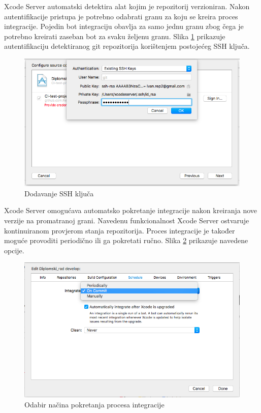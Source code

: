 \documentclass[times, utf8, diplomski, numeric]{fer}
\begin{document}
Xcode Server automatski detektira alat kojim je repozitorij verzioniran. Nakon autentifikacije pristupa je potrebno odabrati granu za koju se kreira proces integracije. Pojedin bot integraciju obavlja za samo jednu granu zbog čega je potrebno kreirati zaseban bot za svaku željenu granu. Slika \ref{fig:BotAddingSSH} prikazuje autentifikaciju detektiranog git repozitorija korištenjem postojećeg SSH ključa.

\begin{figure}
\centering
\includegraphics[scale=0.5]{BotAddingSSH}
\caption{Dodavanje SSH ključa}
\label{fig:BotAddingSSH}
\end{figure}

Xcode Server omogućava automatsko pokretanje integracije nakon kreiranja nove verzije na promatranoj grani. Navedenu funkcionalnost Xcode Server ostvaruje kontinuiranom provjerom stanja repozitorija. Proces integracije je također moguće provoditi periodično ili ga pokretati ručno. Slika \ref{fig:CIStartConfig} prikazuje navedene opcije.

\begin{figure}[b!]
\centering
\includegraphics[scale=0.5]{CIStartConfig}
\caption{Odabir načina pokretanja procesa integracije}
\label{fig:CIStartConfig}
\end{figure}
\end{document}
